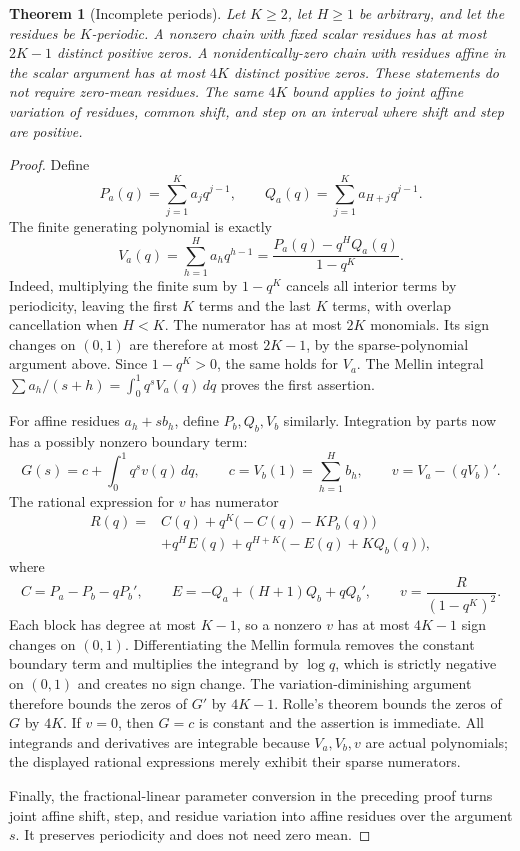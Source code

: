 \documentclass[11pt]{article}
\newtheorem{theorem}{Theorem}
\begin{document}
\begin{theorem}[Incomplete periods]
Let $K\ge2$, let $H\ge1$ be arbitrary, and let the residues be $K$-periodic.
A nonzero chain with fixed scalar residues has at most $2K-1$
distinct positive zeros. A nonidentically-zero chain with residues
affine in the scalar argument has at most $4K$ distinct positive
zeros. These statements do not require zero-mean residues.
The same $4K$ bound applies to joint affine variation of residues,
common shift, and step on an interval where shift and step are positive.
\end{theorem}

\begin{proof}
Define
\[
 P_a(q)=\sum_{j=1}^K a_jq^{j-1},\qquad
 Q_a(q)=\sum_{j=1}^K a_{H+j}q^{j-1}.
\]
The finite generating polynomial is exactly
\[
 V_a(q)=\sum_{h=1}^H a_hq^{h-1}
       =\frac{P_a(q)-q^H Q_a(q)}{1-q^K}.
\]
Indeed, multiplying the finite sum by $1-q^K$ cancels all interior
terms by periodicity, leaving the first $K$ terms and the last $K$
terms, with overlap cancellation when $H<K$.
The numerator has at most $2K$ monomials. Its sign changes on $(0,1)$
are therefore at most $2K-1$, by the sparse-polynomial argument above.
Since $1-q^K>0$, the same holds for $V_a$. The Mellin integral
$\sum a_h/(s+h)=\int_0^1q^sV_a(q)\,dq$ proves the first assertion.

For affine residues $a_h+s b_h$, define $P_b,Q_b,V_b$ similarly.
Integration by parts now has a possibly nonzero boundary term:
\[
 G(s)=c+\int_0^1q^s v(q)\,dq,\qquad
 c=V_b(1)=\sum_{h=1}^H b_h,\qquad
 v=V_a-(qV_b)'.
\]
The rational expression for $v$ has numerator
\[
 \begin{split}
 R(q)={}&C(q)+q^K\bigl(-C(q)-KP_b(q)\bigr)\\
       &+q^H E(q)+q^{H+K}\bigl(-E(q)+KQ_b(q)\bigr),
 \end{split}
\]
where
\[
 C=P_a-P_b-qP_b',\qquad
 E=-Q_a+(H+1)Q_b+qQ_b',\qquad
 v=\frac{R}{(1-q^K)^2}.
\]
Each block has degree at most $K-1$, so a nonzero $v$ has at most
$4K-1$ sign changes on $(0,1)$. Differentiating the Mellin formula
removes the constant boundary term and multiplies the integrand by
$\log q$, which is strictly negative on $(0,1)$ and creates no sign
change. The variation-diminishing argument therefore bounds the zeros
of $G'$ by $4K-1$. Rolle's theorem bounds the zeros of $G$ by $4K$.
If $v=0$, then $G=c$ is constant and the assertion is immediate.
All integrands and derivatives are integrable because $V_a,V_b,v$
are actual polynomials; the displayed rational expressions merely
exhibit their sparse numerators.

Finally, the fractional-linear parameter conversion in the preceding
proof turns joint affine shift, step, and residue variation into affine
residues over the argument $s$. It preserves periodicity and does not
need zero mean.
\end{proof}
\end{document}
